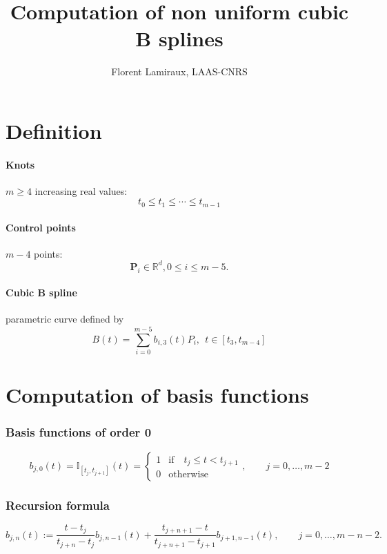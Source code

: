 \documentclass {article}
\title {Computation of non uniform cubic B splines}
\author {Florent Lamiraux, LAAS-CNRS}
\begin{document}
\maketitle
\section {Definition}

\paragraph {Knots} $m \geq 4$ increasing real values:
$$
t_0 \leq t_1 \leq \cdots \leq t_{m-1} 
$$
\paragraph {Control points} $m-4$ points:
$$
\mathbf{P}_{i} \in \mathbb{R}^d, 0\leq i \leq m-5.
$$
\paragraph {Cubic B spline} parametric curve defined by
\begin{equation}\label{eq:spline-definition}
B(t) = \sum_{i=0}^{m-5} b_{i,3} (t) P_i,\ \ t\in [t_3,t_{m-4}]
\end{equation}

\section {Computation of basis functions}

\subsubsection* {Basis functions of order 0}

\begin{equation}\label {eq:basis-0}
b_{j,0}(t) = \mathbb{I}_{[t_j, t_{j+1}]}(t) = \left\{ \begin{matrix} 1 & \mathrm{if} \quad t_j \leq t < t_{j+1} \\ 0 & \mathrm{otherwise} \end{matrix} \right.,\qquad j=0,\ldots, m-2
\end{equation}

\subsubsection* {Recursion formula}

\begin{equation}\label {eq:recursion}
b_{j,n}(t) := \frac{t - t_j}{t_{j+n} - t_j} b_{j,n-1}(t) + \frac{t_{j+n+1} - t}{t_{j+n+1} - t_{j+1}} b_{j+1,n-1}(t) ,\qquad j=0,\ldots, m-n-2. 
\end{equation}
\end{document}
